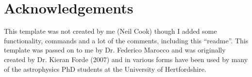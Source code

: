 
\chapter*{Acknowledgements}


This template was not created by me (Neil Cook) though I added some functionality, commands and a lot of the comments, including this ``readme''. This template was passed on to me by Dr. Federico Marocco and was originally created by Dr. Kieran Forde (2007) and in various forms have been used by many of the astrophysics PhD students at the University of Hertfordshire.























